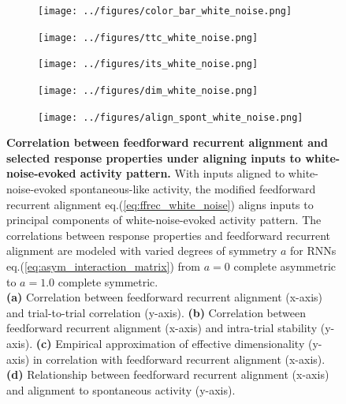 \documentclass[11pt]{article}
\begin{document}
	\begin{figure}[H]
		\centering
		\begin{subfigure}[b]{0.8\textwidth}
			\centering
			\texttt{[image: ../figures/color\_bar\_white\_noise.png]}
		\end{subfigure}
		\vspace{-0.1cm}
		\newline
		\begin{subfigure}[b]{0.45\textwidth}
			\centering
			\texttt{[image: ../figures/ttc\_white\_noise.png]}
			\caption{}
		\end{subfigure}
		\hfill
		\begin{subfigure}[b]{0.45\textwidth}
			\centering
			\texttt{[image: ../figures/its\_white\_noise.png]}
			\caption{}
		\end{subfigure}
		\newline
		\begin{subfigure}[b]{0.45\textwidth}
			\centering
			\texttt{[image: ../figures/dim\_white\_noise.png]}
			\caption{}
		\end{subfigure}
		\hfill
		\begin{subfigure}[b]{0.45\textwidth}
			\centering
			\texttt{[image: ../figures/align\_spont\_white\_noise.png]}
			\caption{}
		\end{subfigure}
		\caption{\textbf{Correlation between feedforward recurrent alignment and selected response properties under aligning inputs to white-noise-evoked activity pattern.} With inputs aligned to white-noise-evoked spontaneous-like activity, the modified feedforward recurrent alignment eq.(\ref{eq:ffrec_white_noise}) aligns inputs to principal components of white-noise-evoked activity pattern. 
		The correlations between response properties and feedforward recurrent alignment are modeled with varied degrees of symmetry $a$ for RNNs eq.(\ref{eq:asym_interaction_matrix}) from $a=0$ complete asymmetric to $a=1.0$ complete symmetric. \\
			\textbf{(a)} Correlation between feedforward recurrent alignment (x-axis) and trial-to-trial correlation (y-axis).
			\textbf{(b)} Correlation between feedforward recurrent alignment (x-axis) and intra-trial stability (y-axis).
			\textbf{(c)} Empirical approximation of effective dimensionality (y-axis) in correlation with feedforward recurrent alignment (x-axis).
			\textbf{(d)} Relationship between feedforward recurrent alignment (x-axis) and alignment to spontaneous activity (y-axis).} 
		\label{fig:ffrec_response_white_noise}
	\end{figure}
\end{document}
